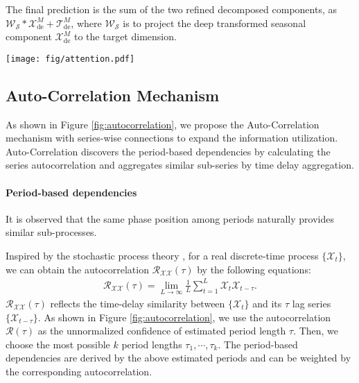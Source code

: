 The final prediction is the sum of the two refined decomposed components, as $\mathcal{W}_{\mathcal{S}}\ast\mathcal{X}_{\mathrm{de}}^{M}+\mathcal{T}_{\mathrm{de}}^{M}$, where $\mathcal{W}_{\mathcal{S}}$ is to project the deep transformed seasonal component $\mathcal{X}_{\mathrm{de}}^{M}$ to the target dimension.

\begin{figure*}
\begin{center}
	\centerline{\texttt{[image: fig/attention.pdf]}}
	\vspace{-5pt}
	\caption{Auto-Correlation (left) and Time Delay Aggregation (right). We utilize the Fast Fourier Transform to calculate the autocorrelation $\mathcal{R}(\tau)$, which reflects the time-delay similarities. Then the similar sub-processes are rolled to the same index based on selected delay $\tau$ and aggregated by $\mathcal{R}(\tau)$.}
	\label{fig:autocorrelation}
	\vspace{-20pt}
\end{center}
\end{figure*}
\vspace{-5pt}
\subsection{Auto-Correlation Mechanism}\label{autocorrelation_calculation}
\vspace{-5pt}
As shown in Figure \ref{fig:autocorrelation}, we propose the Auto-Correlation mechanism with series-wise connections to expand the information utilization. Auto-Correlation discovers the {period-based dependencies} by calculating the series autocorrelation and aggregates similar sub-series by {time delay aggregation}.

\paragraph{Period-based dependencies} It is observed that the same phase position among periods naturally provides similar sub-processes.

Inspired by the stochastic process theory \cite{Chatfield1981TheAO,Papoulis1965ProbabilityRV}, for a real discrete-time process $\{\mathcal{X}_t\}$, we can obtain the autocorrelation $\mathcal{R}_{\mathcal{X}\mathcal{X}}(\tau)$ by the following equations:
\begin{equation}\label{equ:autocorrelation} 
  \begin{split}
    \mathcal{R}_{\mathcal{X}\mathcal{X}}(\tau)=\lim_{L\to \infty}\frac{1}{L}\sum_{t=1}^{L}\mathcal{X}_t\mathcal{X}_{t-\tau}.
  \end{split}
\end{equation}
$\mathcal{R}_{\mathcal{X}\mathcal{X}}(\tau)$ reflects the time-delay similarity between $\{\mathcal{X}_{t}\}$ and its $\tau$ lag series $\{\mathcal{X}_{t-\tau}\}$. As shown in Figure \ref{fig:autocorrelation}, we use the autocorrelation $\mathcal{R}(\tau)$ as the unnormalized confidence of estimated period length $\tau$. Then, we choose the most possible $k$ period lengths $\tau_{1},\cdots,\tau_{k}$. The period-based dependencies are derived by the above estimated periods and can be weighted by the corresponding autocorrelation. 

